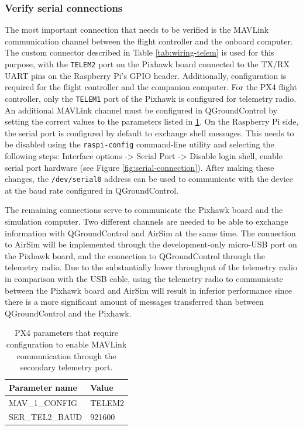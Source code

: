\subsubsection{Verify serial connections}

The most important connection that needs to be verified is the MAVLink communication channel between the flight controller and the onboard computer. The custom connector described in Table \ref{tab:wiring-telem} is used for this purpose, with the \texttt{TELEM2} port on the Pixhawk board connected to the TX/RX UART pins on the Raspberry Pi's GPIO header. Additionally, configuration is required for the flight controller and the companion computer. For the PX4 flight controller, only the \texttt{TELEM1} port of the Pixhawk is configured for telemetry radio. An additional MAVLink channel must be configured in QGroundControl by setting the correct values to the parameters listed in \ref{tab:telem2-params}.
On the Raspberry Pi side, the serial port is configured by default to exchange shell messages. This needs to be disabled using the \texttt{raspi-config} command-line utility and selecting the following steps: Interface options -> Serial Port -> Disable login shell, enable serial port hardware (see Figure \ref{fig:serial-connection}). After making these changes, the \texttt{/dev/serial0} address can be used to communicate with the device at the baud rate configured in QGroundControl.

The remaining connections serve to communicate the Pixhawk board and the simulation computer. Two different channels are needed to be able to exchange information with QGroundControl and AirSim at the same time. The connection to AirSim will be implemented through the development-only micro-USB port on the Pixhawk board, and the connection to QGroundControl through the telemetry radio. Due to the substantially lower throughput of the telemetry radio in comparison with the USB cable, using the telemetry radio to communicate between the Pixhawk board and AirSim will result in inferior performance since there is a more significant amount of messages transferred than between QGroundControl and the Pixhawk.

\begin{table}[h!]
 \begin{center}
  \begin{tabular}{l|l}
    Parameter name & Value \\ \hline
    MAV\_1\_CONFIG & TELEM2 \\
    SER\_TEL2\_BAUD & 921600 \\
  \end{tabular}
  \caption{PX4 parameters that require configuration to enable MAVLink communication through the secondary telemetry port.}
  \label{tab:telem2-params}
 \end{center}
\end{table}



